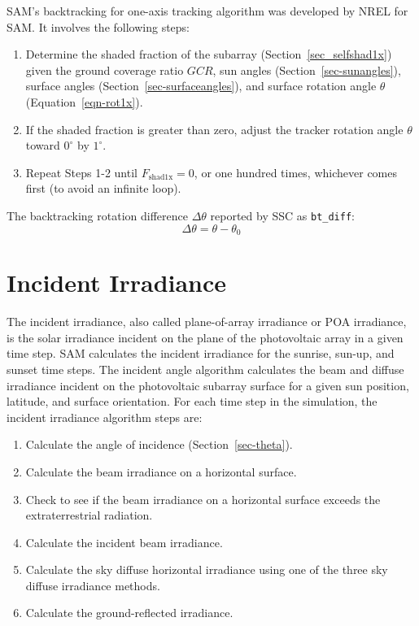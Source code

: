 \documentclass[12pt,letterpaper]{article}
\newcommand\GCR{\ensuremath{\mathit{GCR}}}
\begin{document}
SAM's backtracking for one-axis tracking algorithm was developed by NREL for SAM. It involves the following steps:
\begin{enumerate}
\item Determine the shaded fraction of the subarray (Section~\ref{sec_selfshad1x}) given the ground coverage ratio $\GCR$, sun angles (Section~\ref{sec-sunangles}), surface angles (Section~\ref{sec-surfaceangles}), and surface rotation angle $\theta$ (Equation~\ref{eqn-rot1x}).
\item If the shaded fraction is greater than zero, adjust the tracker rotation angle $\theta$ toward $0^\circ$ by $1^\circ$.
\item Repeat Steps 1-2 until $F_{\mathrm{shad1x}}=0$, or one hundred times, whichever comes first (to avoid an infinite loop).
\end{enumerate}

The backtracking rotation difference $\Delta\theta$ reported by SSC as \texttt{bt\_diff}:
\begin{equation}
\Delta\theta = \theta - \theta_0
\end{equation}

\chapter{Incident Irradiance}\label{sec-incidentirradiance}

The incident irradiance, also called plane-of-array irradiance or POA irradiance, is the solar irradiance incident on the plane of the photovoltaic array in a given time step. SAM calculates the incident irradiance for the sunrise, sun-up, and sunset time steps. The incident angle algorithm calculates the beam and diffuse irradiance incident on the photovoltaic subarray surface for a given sun position, latitude, and surface orientation. For each time step in the simulation, the incident irradiance algorithm steps are:

\begin{enumerate}
\item Calculate the angle of incidence (Section~\ref{sec-theta}).
\item Calculate the beam irradiance on a horizontal surface.
\item Check to see if the beam irradiance on a horizontal surface exceeds the extraterrestrial radiation.
\item Calculate the incident beam irradiance.
\item Calculate the sky diffuse horizontal irradiance using one of the three sky diffuse irradiance methods.
\item Calculate the ground-reflected irradiance.
\end{enumerate}
\end{document}
